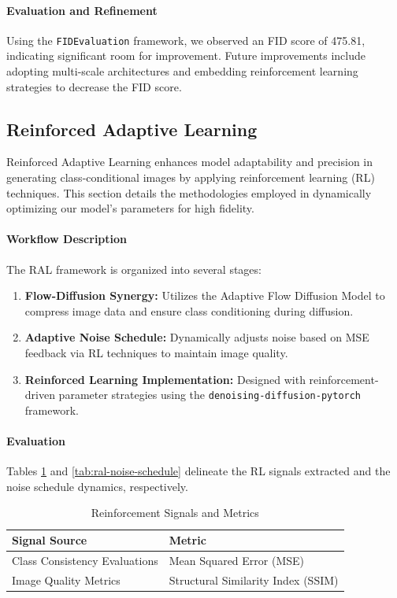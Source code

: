 \paragraph{Evaluation and Refinement}
Using the \texttt{FIDEvaluation} framework, we observed an FID score of 475.81, indicating significant room for improvement. Future improvements include adopting multi-scale architectures and embedding reinforcement learning strategies to decrease the FID score.

\subsection{Reinforced Adaptive Learning}

Reinforced Adaptive Learning enhances model adaptability and precision in generating class-conditional images by applying reinforcement learning (RL) techniques. This section details the methodologies employed in dynamically optimizing our model's parameters for high fidelity.

\paragraph{Workflow Description}
The RAL framework is organized into several stages:

\begin{enumerate}
    \item \textbf{Flow-Diffusion Synergy:} Utilizes the Adaptive Flow Diffusion Model to compress image data and ensure class conditioning during diffusion.
    
    \item \textbf{Adaptive Noise Schedule:} Dynamically adjusts noise based on MSE feedback via RL techniques to maintain image quality.
    
    \item \textbf{Reinforced Learning Implementation:} Designed with reinforcement-driven parameter strategies using the \texttt{denoising-diffusion-pytorch} framework.
\end{enumerate}

\paragraph{Evaluation}
Tables \ref{tab:ral-reinforcement-signals} and \ref{tab:ral-noise-schedule} delineate the RL signals extracted and the noise schedule dynamics, respectively.

\begin{table}[!ht]
\centering
\label{tab:ral-reinforcement-signals}
\begin{tabular}{|l|l|}
\hline
\textbf{Signal Source} & \textbf{Metric} \\ \hline
Class Consistency Evaluations & Mean Squared Error (MSE) \\ \hline
Image Quality Metrics & Structural Similarity Index (SSIM) \\ \hline
\end{tabular}
\caption{Reinforcement Signals and Metrics}
\end{table}

